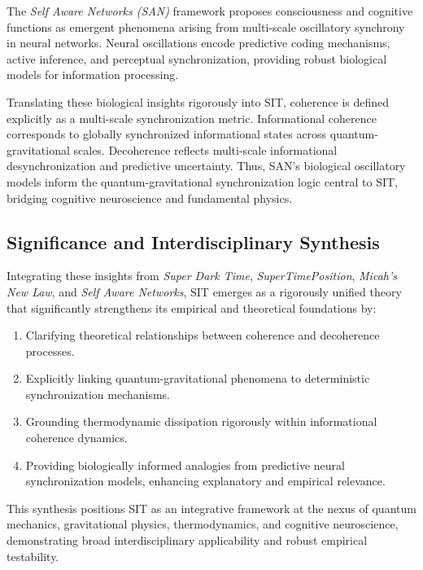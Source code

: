 \documentclass[american,11pt,letterpaper]{article}
\begin{document}
The \textit{Self Aware Networks (SAN)} framework proposes consciousness and cognitive functions as emergent phenomena arising from multi-scale oscillatory synchrony in neural networks. Neural oscillations encode predictive coding mechanisms, active inference, and perceptual synchronization, providing robust biological models for information processing.

Translating these biological insights rigorously into SIT, coherence is defined explicitly as a multi-scale synchronization metric. Informational coherence corresponds to globally synchronized informational states across quantum-gravitational scales. Decoherence reflects multi-scale informational desynchronization and predictive uncertainty. Thus, SAN's biological oscillatory models inform the quantum-gravitational synchronization logic central to SIT, bridging cognitive neuroscience and fundamental physics.

\subsection{Significance and Interdisciplinary Synthesis}

Integrating these insights from \textit{Super Dark Time}, \textit{SuperTimePosition}, \textit{Micah's New Law}, and \textit{Self Aware Networks}, SIT emerges as a rigorously unified theory that significantly strengthens its empirical and theoretical foundations by:

\begin{enumerate}
    \item Clarifying theoretical relationships between coherence and decoherence processes.
    \item Explicitly linking quantum-gravitational phenomena to deterministic synchronization mechanisms.
    \item Grounding thermodynamic dissipation rigorously within informational coherence dynamics.
    \item Providing biologically informed analogies from predictive neural synchronization models, enhancing explanatory and empirical relevance.
\end{enumerate}

This synthesis positions SIT as an integrative framework at the nexus of quantum mechanics, gravitational physics, thermodynamics, and cognitive neuroscience, demonstrating broad interdisciplinary applicability and robust empirical testability.
\end{document}
